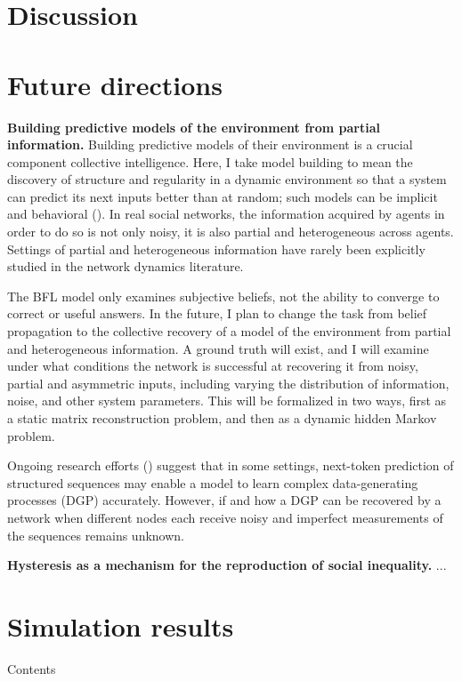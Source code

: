 \documentclass[]{article}
\begin{document}
\section{Discussion}


\section{Future directions}

\textbf{Building predictive models of the environment from partial information.} Building predictive models of their environment is a crucial component collective intelligence. Here, I take model building to mean the discovery of structure and regularity in a dynamic environment so that a system can predict its next inputs better than at random; such models can be implicit and behavioral (\cite{crutchfieldCalculiEmergenceComputation1994}). In real social networks, the information acquired by agents in order to do so is not only noisy, it is also partial and heterogeneous across agents. Settings of partial and heterogeneous information have rarely been explicitly studied in the network dynamics literature.

The BFL model only examines subjective beliefs, not the ability to converge to correct or useful answers. In the future, I plan to change the task from belief propagation to the collective recovery of a model of the environment from partial and heterogeneous information. A ground truth will exist, and I will examine under what conditions the network is successful at recovering it from noisy, partial and asymmetric inputs, including varying the distribution of information, noise, and other system parameters. This will be formalized in two ways, first as a static matrix reconstruction problem, and then as a dynamic hidden Markov problem.

Ongoing research efforts (\cite{malachAutoRegressiveNextTokenPredictors2023}) suggest that in some settings, next-token prediction of structured sequences may enable a model to learn complex data-generating processes (DGP) accurately. However, if and how a DGP can be recovered by a network when different nodes each receive noisy and imperfect measurements of the sequences remains unknown.

\textbf{Hysteresis as a mechanism for the reproduction of social inequality.} ...

\printbibliography[heading=bibintoc, title={References}]



\appendix

\section{Simulation results}

Contents
\end{document}
